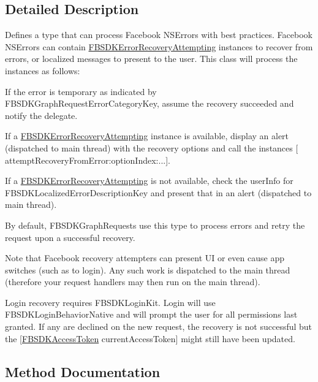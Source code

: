 \subsection{Detailed Description}
Defines a type that can process Facebook N\+S\+Errors with best practices.  Facebook N\+S\+Errors can contain \hyperlink{protocol_f_b_s_d_k_error_recovery_attempting-p}{F\+B\+S\+D\+K\+Error\+Recovery\+Attempting} instances to recover from errors, or localized messages to present to the user. This class will process the instances as follows\+:


\begin{DoxyEnumerate}
\item If the error is temporary as indicated by F\+B\+S\+D\+K\+Graph\+Request\+Error\+Category\+Key, assume the recovery succeeded and notify the delegate.
\item If a \hyperlink{protocol_f_b_s_d_k_error_recovery_attempting-p}{F\+B\+S\+D\+K\+Error\+Recovery\+Attempting} instance is available, display an alert (dispatched to main thread) with the recovery options and call the instance\textquotesingle{}s \mbox{[} attempt\+Recovery\+From\+Error\+:option\+Index\+:...\mbox{]}.
\item If a \hyperlink{protocol_f_b_s_d_k_error_recovery_attempting-p}{F\+B\+S\+D\+K\+Error\+Recovery\+Attempting} is not available, check the user\+Info for F\+B\+S\+D\+K\+Localized\+Error\+Description\+Key and present that in an alert (dispatched to main thread).
\end{DoxyEnumerate}

By default, F\+B\+S\+D\+K\+Graph\+Requests use this type to process errors and retry the request upon a successful recovery.

Note that Facebook recovery attempters can present U\+I or even cause app switches (such as to login). Any such work is dispatched to the main thread (therefore your request handlers may then run on the main thread).

Login recovery requires F\+B\+S\+D\+K\+Login\+Kit. Login will use F\+B\+S\+D\+K\+Login\+Behavior\+Native and will prompt the user for all permissions last granted. If any are declined on the new request, the recovery is not successful but the {\ttfamily \mbox{[}\hyperlink{interface_f_b_s_d_k_access_token}{F\+B\+S\+D\+K\+Access\+Token} current\+Access\+Token\mbox{]}} might still have been updated.

\subsection{Method Documentation}
\hypertarget{interface_f_b_s_d_k_graph_error_recovery_processor_a2b4fe67a50c150f8b5fc0e664d92c552}{}
